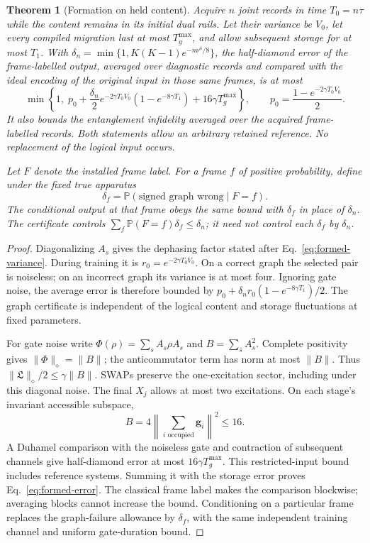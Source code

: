 \documentclass[11pt]{article}
\newtheorem{theorem}{Theorem}[section]
\theoremstyle{definition}
\theoremstyle{remark}
\newcommand{\Prb}{\mathbb P}
\begin{document}
\begin{theorem}[Formation on held content]
\label{thm:formed-carrier}
Acquire $n$ joint records in time $T_0=n\tau$ while the content remains in its
initial dual rails. Let their variance be $V_0$, let every compiled migration
last at most $T_g^{\max}$, and allow subsequent storage for at most $T_1$.
With $\delta_n=\min\{1,K(K-1)e^{-n\nu^4/8}\}$, the half-diamond error
of the frame-labelled output, averaged over diagnostic records and compared
with the ideal encoding of the original input in those same frames, is at most
\begin{equation}\label{eq:formed-error}
 \min\left\{1,\;
 p_0+\frac{\delta_n}2 e^{-2\gamma T_0V_0}
           (1-e^{-8\gamma T_1})+16\gamma T_g^{\max}\right\},\qquad
 p_0=\frac{1-e^{-2\gamma T_0V_0}}2.
\end{equation}
It also bounds the entanglement infidelity averaged over the acquired
frame-labelled records. Both statements allow an arbitrary retained
reference. No replacement of the logical input occurs.

Let $F$ denote the installed frame label. For a frame $f$ of positive
probability, define under the fixed true apparatus
\[
 \delta_f=\Prb(\text{signed graph wrong}\mid F=f).
\]
The conditional output at that frame obeys the same
bound with $\delta_f$ in place of $\delta_n$. The certificate controls
$\sum_f\Prb(F=f)\delta_f\le\delta_n$; it need not control each
$\delta_f$ by $\delta_n$.
\end{theorem}
\begin{proof}
Diagonalizing $A_s$ gives the dephasing factor stated after
Eq.~\eqref{eq:formed-variance}. During training it is
$r_0=e^{-2\gamma T_0V_0}$. On a correct graph the selected pair is noiseless;
on an incorrect graph its variance is at most four. Ignoring gate noise,
the average error is therefore bounded by
$p_0+\delta_n r_0(1-e^{-8\gamma T_1})/2$. The graph certificate is
independent of the logical content and storage fluctuations at fixed
parameters.

For gate noise write $\Phi(\rho)=\sum_sA_s\rho A_s$ and
$B=\sum_sA_s^2$. Complete positivity gives
$\|\Phi\|_\diamond=\|B\|$; the anticommutator term has norm at most
$\|B\|$. Thus $\|\mathfrak L\|_\diamond/2\le\gamma\|B\|$.
SWAPs preserve the one-excitation sector, including under this diagonal
noise. The final $X_j$ allows at most two excitations. On each stage's
invariant accessible subspace,
\[
 B=4\left\|\sum_{i\text{ occupied}}\boldsymbol g_i\right\|^2\le16.
\]
A Duhamel comparison with the noiseless gate and contraction of subsequent
channels give half-diamond error at most $16\gamma T_g^{\max}$.
This restricted-input bound includes reference systems. Summing it with
the storage error proves Eq.~\eqref{eq:formed-error}. The classical
frame label makes the comparison blockwise; averaging blocks cannot
increase the bound. Conditioning on a particular frame replaces the
graph-failure allowance by $\delta_f$, with the same independent
training channel and uniform gate-duration bound.
\end{proof}
\end{document}
